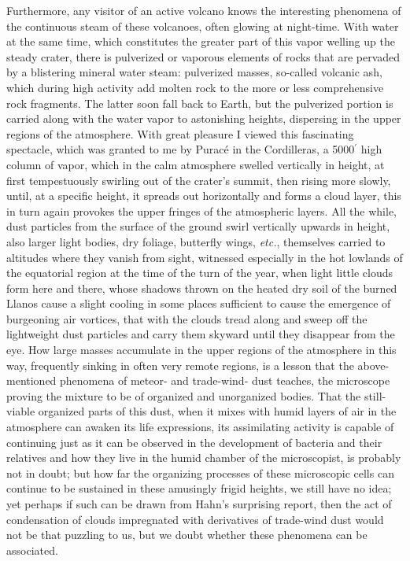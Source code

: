\documentclass[a4paper, 12pt, oneside]{article}
\begin{document}
Furthermore, any visitor of an active volcano knows the interesting phenomena of the continuous steam of these volcanoes, often glowing at night-time. With water at the same time, which constitutes the greater part of this vapor welling up the steady crater, there is pulverized or vaporous elements of rocks that are pervaded by a blistering mineral water steam: pulverized masses, so-called volcanic ash, which during high activity add molten rock to the more or less comprehensive rock fragments. The latter soon fall back to Earth, but the pulverized portion is carried along with the water vapor to astonishing heights, dispersing in the upper regions of the atmosphere. With great pleasure I viewed this fascinating spectacle, which was granted to me by Puracé in the Cordilleras, a 5000$^{\prime}$ high column of vapor, which in the calm atmosphere swelled vertically in height, at first tempestuously swirling out of the crater's summit, then rising more slowly, until, at a specific height, it spreads out horizontally and forms a cloud layer, this in turn again provokes the upper fringes of the atmospheric layers. All the while, dust particles from the surface of the ground swirl vertically upwards in height, also larger light bodies, dry foliage, butterfly wings, \emph{etc.}, themselves carried to altitudes where they vanish from sight, witnessed especially in the hot lowlands of the equatorial region at the time of the turn of the year, when light little clouds form here and there, whose shadows thrown on the heated dry soil of the burned Llanos cause a slight cooling in some places sufficient to cause the emergence of burgeoning air vortices, that with the clouds tread along and sweep off the lightweight dust particles and carry them skyward until they disappear from the eye. How large masses accumulate in the upper regions of the atmosphere in this way, frequently sinking in often very remote regions, is a lesson that the above-mentioned phenomena of meteor- and trade-wind- dust teaches, the microscope proving the mixture to be of organized and unorganized bodies. That the still-viable organized parts of this dust, when it mixes with humid layers of air in the atmosphere can awaken its life expressions, its assimilating activity is capable of continuing just as it can be observed in the development of bacteria and their relatives and how they live in the humid chamber of the microscopist, is probably not in doubt; but how far the organizing processes of these microscopic cells can continue to be sustained in these amusingly frigid heights, we still have no idea; yet perhaps if such can be drawn from Hahn's surprising report, then the act of condensation of clouds impregnated with derivatives of trade-wind dust would not be that puzzling to us, but we doubt whether these phenomena can be associated.
\end{document}
